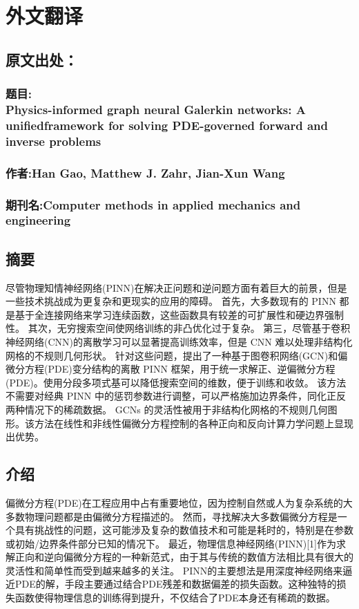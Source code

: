 \cleardoublepage
\chapter{外文翻译}
\section{原文出处：}
\subsection*{题目:\\Physics-informed graph neural Galerkin networks: A unifiedframework for solving PDE-governed forward and inverse problems}
\subsection*{作者:Han Gao, Matthew J. Zahr, Jian-Xun Wang}
\subsection*{期刊名:Computer methods in applied mechanics and engineering}
\newpage

\section{摘要}
尽管物理知情神经网络(PINN)在解决正问题和逆问题方面有着巨大的前景，但是一些技术挑战成为更复杂和更现实的应用的障碍。
首先，大多数现有的 PINN 都是基于全连接网络来学习连续函数，这些函数具有较差的可扩展性和硬边界强制性。
其次，无穷搜索空间使网络训练的非凸优化过于复杂。
第三，尽管基于卷积神经网络(CNN)的离散学习可以显著提高训练效率，但是 CNN 难以处理非结构化网格的不规则几何形状。
针对这些问题，提出了一种基于图卷积网络(GCN)和偏微分方程(PDE)变分结构的离散 PINN 框架，用于统一求解正、逆偏微分方程(PDE)。使用分段多项式基可以降低搜索空间的维数，便于训练和收敛。
该方法不需要对经典 PINN 中的惩罚参数进行调整，可以严格施加边界条件，同化正反两种情况下的稀疏数据。
GCNs 的灵活性被用于非结构化网格的不规则几何图形。该方法在线性和非线性偏微分方程控制的各种正向和反向计算力学问题上显现出优势。
\section{介绍}
偏微分方程(PDE)在工程应用中占有重要地位，因为控制自然或人为复杂系统的大多数物理问题都是由偏微分方程描述的。
然而，寻找解决大多数偏微分方程是一个具有挑战性的问题，这可能涉及复杂的数值技术和可能是耗时的，特别是在参数或初始/边界条件部分已知的情况下。
最近，物理信息神经网络(PINN)[1]作为求解正向和逆向偏微分方程的一种新范式，由于其与传统的数值方法相比具有很大的灵活性和简单性而受到越来越多的关注。
PINN的主要想法是用深度神经网络来逼近PDE的解，手段主要通过结合PDE残差和数据偏差的损失函数。这种独特的损失函数使得物理信息的训练得到提升，不仅结合了PDE本身还有稀疏的数据。

